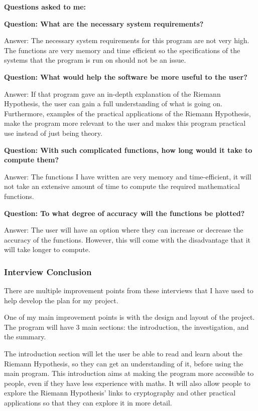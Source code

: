 \documentclass{article}
\begin{document}
\textbf{Questions asked to me:}

\textbf{Question: What are the necessary system requirements?}

Answer: The necessary system requirements for this program are not very high. The functions are very memory and time efficient so the specifications of the systems that the program is run on should not be an issue.

\textbf{Question: What would help the software be more useful to the user?}

Answer: If that program gave an in-depth explanation of the Riemann Hypothesis, the user can gain a full understanding of what is going on. Furthermore, examples of the practical applications of the Riemann Hypothesis, make the program more relevant to the user and makes this program practical use instead of just being theory.

\textbf{Question: With such complicated functions, how long would it take to compute them?}

Answer: The functions I have written are very memory and time-efficient, it will not take an extensive amount of time to compute the required mathematical functions.

\textbf{Question: To what degree of accuracy will the functions be plotted?}

Answer: The user will have an option where they can increase or decrease the accuracy of the functions. However, this will come with the disadvantage that it will take longer to compute.

\subsubsection{Interview Conclusion}
There are multiple improvement points from these interviews that I have used to help develop the plan for my project.

One of my main improvement points is with the design and layout of the project. The program will have 3 main sections: the introduction, the investigation, and the summary.

The introduction section will let the user be able to read and learn about the Riemann Hypothesis, so they can get an understanding of it, before using the main program. This introduction aims at making the program more accessible to people, even if they have less experience with maths. It will also allow people to explore the Riemann Hypothesis’ links to cryptography and other practical applications so that they can explore it in more detail.
\end{document}
